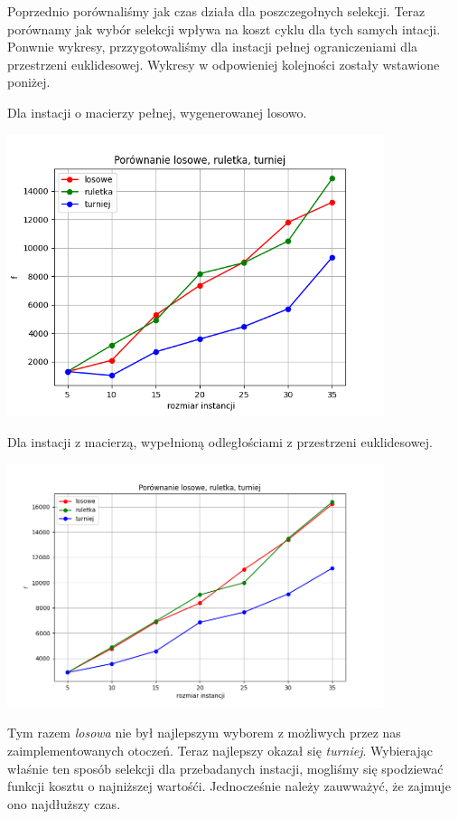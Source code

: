 \documentclass{article}
\begin{document}
    Poprzednio porównaliśmy jak czas działa dla poszczegołnych selekcji. Teraz
    porównamy jak wybór selekcji wpływa na koszt cyklu dla tych samych
    intacji. Ponwnie wykresy, przzygotowaliśmy dla instacji pełnej ograniczeniami
    dla przestrzeni euklidesowej. Wykresy w odpowieniej kolejności zostały
    wstawione poniżej.

    Dla instacji o macierzy pełnej, wygenerowanej losowo.

    \includegraphics[width=11cm]{./spr3img/Figure_1FULL.png}

    Dla instacji z macierzą, wypełnioną odległościami z przestrzeni
    euklidesowej.

    \includegraphics[width=11cm]{./spr3img/Figure_1.png}

    Tym razem \emph{losowa} nie był najlepszym wyborem z możliwych przez nas
    zaimplementowanych otoczeń. Teraz najlepszy okazał się \emph{turniej}.
    Wybierając właśnie ten sposób selekcji dla przebadanych instacji, mogliśmy się
    spodziewać funkcji kosztu o najniższej wartośći. Jednocześnie należy zauwważyć,
    że zajmuje ono najdłuższy czas.
\end{document}
